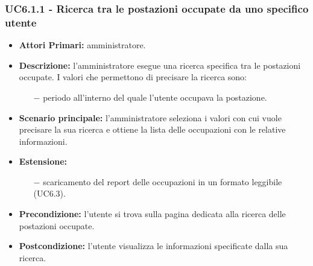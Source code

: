 \subsubsection{ UC6.1.1 - Ricerca tra le postazioni occupate da uno specifico utente}
\begin{itemize}
	\item\textbf{Attori Primari:} 
	amministratore.
	\item\textbf{Descrizione:} 
	l'amministratore esegue una ricerca specifica tra le postazioni occupate.
	I valori che permettono di precisare la ricerca sono:
	\begin{itemize}
		\item[$-$] periodo all'interno del quale l'utente occupava la postazione.
	\end{itemize}
	\item\textbf{Scenario principale:} 
	l'amministratore seleziona i valori con cui vuole precisare la sua ricerca e ottiene la lista delle occupazioni con le relative informazioni.
	\item\textbf{Estensione:}
	\begin{itemize}
		\item[$-$] scaricamento del report delle occupazioni in un formato leggibile (UC6.3).
	\end{itemize}
	\item\textbf{Precondizione:} 
	l'utente si trova sulla pagina dedicata alla ricerca delle postazioni occupate.
	\item\textbf{Postcondizione:}
	l'utente visualizza le informazioni specificate dalla sua ricerca.
\end{itemize}

